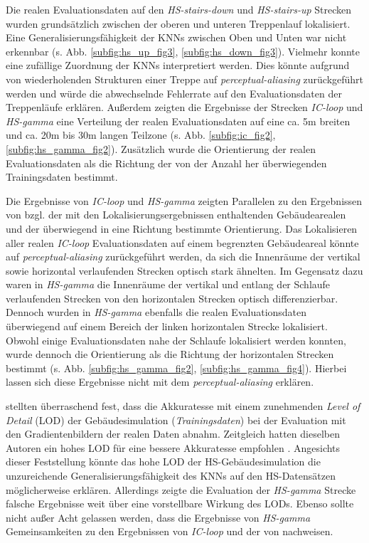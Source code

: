 Die realen Evaluationsdaten auf den \textit{HS-stairs-down} und \textit{HS-stairs-up} Strecken wurden grundsätzlich zwischen der oberen und unteren Treppenlauf lokalisiert. Eine Generalisierungsfähigkeit der KNNs zwischen Oben und Unten war nicht erkennbar (s. Abb. \ref{subfig:hs_up_fig3}, \ref{subfig:hs_down_fig3}). Vielmehr konnte eine zufällige Zuordnung der KNNs interpretiert werden. Dies könnte aufgrund von wiederholenden Strukturen einer Treppe auf \textit{perceptual-aliasing} zurückgeführt werden und würde die abwechselnde Fehlerrate auf den Evaluationsdaten der Treppenläufe erklären. Außerdem zeigten die Ergebnisse der Strecken \textit{IC-loop} und \textit{HS-gamma} eine Verteilung der realen Evaluationsdaten auf eine ca. 5m breiten und ca. 20m bis 30m langen Teilzone (s. Abb. \ref{subfig:ic_fig2}, \ref{subfig:hs_gamma_fig2}). Zusätzlich wurde die Orientierung der realen Evaluationsdaten als die Richtung der von der Anzahl her überwiegenden Trainingsdaten bestimmt.


Die Ergebnisse von \textit{IC-loop} und \textit{HS-gamma} zeigten Parallelen zu den Ergebnissen von \citet{acharyaBIMPoseNetIndoorCamera2019} bzgl. der mit den Lokalisierungsergebnissen enthaltenden Gebäudearealen und 
der überwiegend in eine Richtung bestimmte Orientierung.
Das Lokalisieren aller realen \textit{IC-loop} Evaluationsdaten auf einem begrenzten Gebäudeareal könnte auf \textit{perceptual-aliasing} zurückgeführt werden, da sich die Innenräume der vertikal sowie horizontal verlaufenden Strecken optisch stark ähnelten. Im Gegensatz dazu waren in \textit{HS-gamma} die Innenräume der vertikal und entlang der Schlaufe verlaufenden Strecken von den horizontalen Strecken optisch differenzierbar. Dennoch wurden in \textit{HS-gamma} ebenfalls die realen Evaluationsdaten überwiegend auf einem Bereich der linken horizontalen Strecke lokalisiert. Obwohl einige Evaluationsdaten nahe der Schlaufe lokalisiert werden konnten, wurde dennoch die Orientierung als die Richtung der horizontalen Strecken bestimmt (s. Abb. \ref{subfig:hs_gamma_fig2}, \ref{subfig:hs_gamma_fig4}). Hierbei lassen sich diese Ergebnisse nicht mit dem \textit{perceptual-aliasing} erklären.

\citet{acharyaBIMPoseNetIndoorCamera2019} stellten überraschend fest, dass die Akkuratesse mit einem zunehmenden \textit{Level of Detail} (LOD) der Gebäudesimulation (\textit{Trainingsdaten}) bei der Evaluation mit den Gradientenbildern der realen Daten abnahm. Zeitgleich hatten dieselben Autoren ein hohes LOD für eine bessere Akkuratesse empfohlen \cite{acharyaBIMPoseNetIndoorCamera2019}. Angesichts dieser Feststellung könnte das hohe LOD der HS-Gebäudesimulation die unzureichende Generalisierungsfähigkeit des KNNs auf den HS-Datensätzen möglicherweise erklären. Allerdings zeigte die Evaluation der \textit{HS-gamma} Strecke falsche Ergebnisse weit über eine vorstellbare Wirkung des LODs. Ebenso sollte nicht außer Acht gelassen werden, dass die Ergebnisse von \textit{HS-gamma} Gemeinsamkeiten zu den Ergebnissen von \textit{IC-loop} und der von \citet{acharyaBIMPoseNetIndoorCamera2019} nachweisen.

